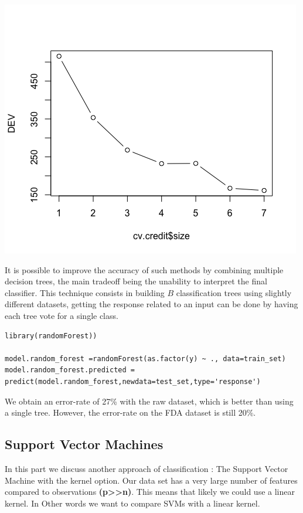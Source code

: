 \documentclass[]{report}
\begin{document}
    \begin{center}
 	\includegraphics[width=0.6\linewidth]{Figures/tree_fda_cv.png}
 	\label{fig:tree_fda_cv}
 \end{center}
 
 It is possible to improve the accuracy of such methods by combining multiple decision trees, the main tradeoff being the unability to interpret the final classifier. This technique consists in building $B$ classification trees using slightly different datasets, getting the response related to an input can be done by having each tree vote for a single class.
 
\begin{lstlisting}
library(randomForest))

model.random_forest =randomForest(as.factor(y) ~ ., data=train_set)
model.random_forest.predicted = predict(model.random_forest,newdata=test_set,type='response')
\end{lstlisting}

We obtain an error-rate of 27\% with the raw dataset, which is better than using a single tree. However, the error-rate on the FDA dataset is still 20\%.
 
\pagebreak
\subsection{Support Vector Machines}
In this part we discuss another approach of classification : The Support Vector Machine with the kernel option. Our data set has a very large number of features compared to observations \textbf{(p>>n)}. This means that likely we could use a linear kernel. In Other words we want to compare SVMs with a linear kernel.
\end{document}
